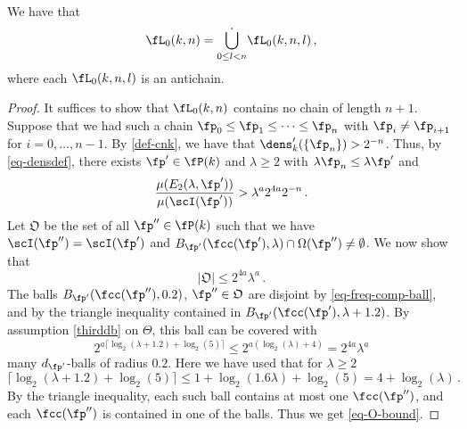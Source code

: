 \begin{lemma}[L0 antichain]
\label{L0-antichain}
\leanok
{}
    We have that
    $$
        \fL_0(k,n) = \dot{\bigcup_{0 \le l < n}} \fL_0(k,n,l)\,,
    $$
    where each $\fL_0(k,n,l)$ is an antichain.
\end{lemma}

\begin{proof}
    \leanok
    It suffices to show that $\fL_0(k,n)$ contains no chain of length $n + 1$. Suppose that we had such a chain $\fp_0 \le \fp_1 \le \dotsb \le \fp_{n}$ with $\fp_i \ne \fp_{i+1}$ for $i =0, \dotsc, n-1$. By \eqref{def-cnk}, we have that $\dens_k'(\{\fp_n\}) > 2^{-n}$. Thus, by \eqref{eq-densdef}, there exists $\fp' \in \fP(k)$ and $\lambda \ge 2$ with $\lambda \fp_n \le \lambda \fp'$ and
    \begin{equation}
        \label{eq-p'}
        \frac{\mu(E_2(\lambda, \fp'))}{\mu(\scI(\fp'))} > \lambda^{a} 2^{4a} 2^{-n}\,.
    \end{equation}
    Let $\mathfrak{O}$ be the set of all $\fp'' \in \fP(k)$ such that we have $ \scI(\fp'') = \scI(\fp')$ and $B_{\fp'}(\fcc(\fp'), \lambda) \cap \Omega(\fp'') \neq \emptyset$.
    We now show that
    \begin{equation}
        \label{eq-O-bound}
        |\mathfrak{O}| \le 2^{4a}\lambda^a\,.
    \end{equation}
    The balls $B_{\fp'}(\fcc(\fp''), 0.2)$, $\fp'' \in \mathfrak{O}$ are disjoint by \eqref{eq-freq-comp-ball},
    and by the triangle inequality contained in $B_{\fp'}(\fcc(\fp'), \lambda+1.2)$.
    By assumption \eqref{thirddb} on $\Theta$, this ball can be covered with
    $$
        2^{a\lceil \log_2(\lambda+1.2) + \log_2(5)\rceil} \le 2^{a(\log_2(\lambda) + 4)} = 2^{4a}\lambda^a
    $$
    many $d_{\fp'}$-balls of radius $0.2$. Here we have used that for $\lambda \ge 2$
    $$
        \lceil \log_2(\lambda + 1.2)  + \log_2(5) \rceil \le 1+ \log_2(1.6  \lambda) + \log_2(5) = 4 + \log_2(\lambda)\,.
    $$
    By the triangle inequality, each such ball contains at most one $\fcc(\fp'')$, and each $\fcc(\fp'')$ is contained in one of the balls. Thus we get \eqref{eq-O-bound}.


\end{proof}
